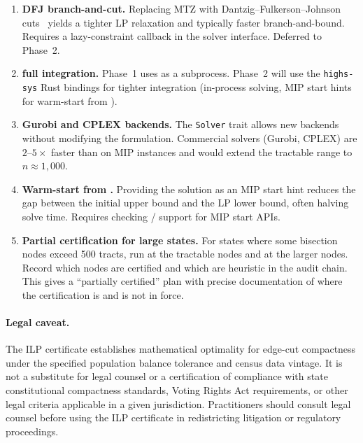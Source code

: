 \begin{enumerate}
\item \textbf{DFJ branch-and-cut.}
  Replacing MTZ with Dantzig--Fulkerson--Johnson cuts~\citep{nemhauser1988}
  yields a tighter LP relaxation and typically faster branch-and-bound.
  Requires a lazy-constraint callback in the solver interface.
  Deferred to Phase~2.

\item \textbf{\highs{} full integration.}
  Phase~1 uses \highs{} as a subprocess.
  Phase~2 will use the \texttt{highs-sys} Rust bindings for tighter
  integration (in-process solving, MIP start hints for warm-start from
  \metis{}).

\item \textbf{Gurobi and CPLEX backends.}
  The \texttt{Solver} trait allows new backends without modifying the
  formulation.
  Commercial solvers (Gurobi, CPLEX) are $2$--$5\times$ faster than
  \glpk{} on MIP instances and would extend the tractable range to
  $n \approx 1{,}000$.

\item \textbf{Warm-start from \metis{}.}
  Providing the \metis{} solution as an MIP start hint reduces the
  gap between the initial upper bound and the LP lower bound,
  often halving solve time.
  Requires checking \glpk{}/\highs{} support for MIP start APIs.

\item \textbf{Partial certification for large states.}
  For states where some bisection nodes exceed 500 tracts, run \ilp{}
  at the tractable nodes and \metis{} at the larger nodes.
  Record which nodes are certified and which are heuristic in the audit
  chain.
  This gives a ``partially certified'' plan with precise documentation
  of where the certification is and is not in force.
\end{enumerate}

\paragraph{Legal caveat.}
The ILP certificate establishes mathematical optimality for edge-cut
compactness under the specified population balance tolerance and census
data vintage.
It is not a substitute for legal counsel or a certification of compliance
with state constitutional compactness standards, Voting Rights Act
requirements, or other legal criteria applicable in a given jurisdiction.
Practitioners should consult legal counsel before using the ILP
certificate in redistricting litigation or regulatory proceedings.

